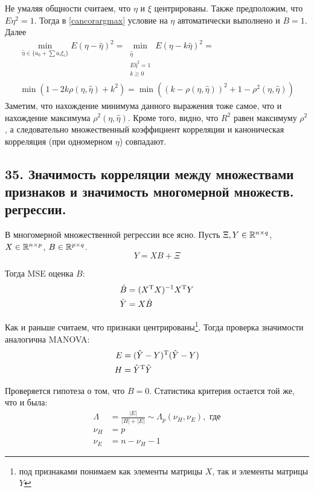 Не умаляя общности считаем, что $\eta$ и $\xi$ центрированы. Также предположим, что $E\eta^2=1$. Тогда в \eqref{cancorargmax} условие на $\eta$ автоматически выполнено и $B=1$. Далее
\begin{equation}
\begin{split}
\min\limits_{\hat{\eta} \in\{a_0 + \sum a_i \xi_i\}} E\left(\eta-\hat{\eta}\right)^2 = \min\limits_{\substack{\hat{\eta}\\ E\hat{\eta}^2 = 1\\ k \geq 0}}  E\left(\eta-k\hat{\eta}\right)^2 = \\
\min \left(1 - 2k\rho(\eta, \hat{\eta}) + k^2\right) = \min\left( \left(k-\rho(\eta, \hat{\eta})\right)^2 + 1 - \rho^2(\eta, \hat{\eta})\right) 
\end{split}
\end{equation}
Заметим, что нахождение минимума данного выражения тоже самое, что и нахождение максимума $\rho^2(\eta,\hat{\eta})$. Кроме того, видно, что $R^2$ равен максимуму $\rho^2$, а следовательно множественный коэффициент корреляции и каноническая корреляция (при одномерном $\eta$) совпадают. 

\subsection{35. Значимость корреляции между множествами признаков и значимость многомерной множеств. регрессии.}

В многомерной множественной регрессии все ясно. Пусть $\Xi, Y \in \mathbb{R}^{n  \times q}$, $X \in \mathbb{R}^{n \times p}$, $B \in \mathbb{R}^{p \times q}$.
\begin{equation}
Y = X B  + \Xi
\end{equation}

Тогда MSE оценка $B$:
\begin{align}
\hat{B} &=  (X^{\mathrm{T}}X)^{-1}X^{\mathrm{T}}Y \\
\hat{Y} &= X\hat{B}
\end{align}

Как и раньше считаем, что признаки центрированы\footnote{под признаками понимаем как элементы матрицы $X$, так и элементы матрицы $Y$}. Тогда проверка значимости аналогична MANOVA:
\begin{align}
E &= (\hat{Y} - Y)^{\mathrm{T}}(\hat{Y} - Y) \\
H &= \hat{Y}^{\mathrm{T}}\hat{Y} 
\end{align}

Проверяется гипотеза о том, что $B = 0$. Статистика критерия остается той же, что и была:
\begin{align}
\Lambda& = \frac{|E|}{|H|+|E|} \sim \Lambda_p(\nu_H, \nu_E), \text{ где}\\
\nu_H& = p\\
\nu_E& = n - \nu_H - 1
\end{align}

